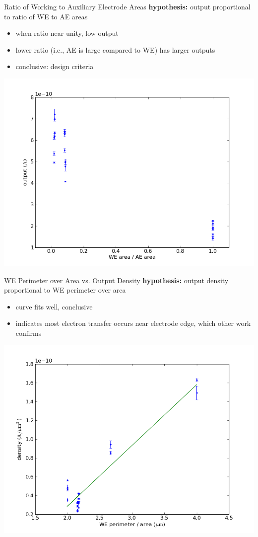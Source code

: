 \documentclass[10pt]{beamer}
\begin{document}
\begin{frame}{Ratio of Working to Auxiliary Electrode Areas}
	\textbf{hypothesis:} output proportional to ratio of WE to AE areas
	\begin{itemize}
		\item when ratio near unity, low output
		\item lower ratio (i.e., AE is large compared to WE) has larger outputs
		\item conclusive: design criteria
	\end{itemize}
	\includegraphics[width=0.8\linewidth]{figures/area_ratio_v_output.png}
\end{frame}

\begin{frame}{WE Perimeter over Area vs. Output Density}
	\textbf{hypothesis:} output density proportional to WE perimeter over area
	\begin{itemize}
		\item curve fits well, conclusive
		\item indicates most electron transfer occurs near electrode edge, which other work confirms
	\end{itemize}
	\includegraphics[width=0.8\linewidth]{figures/perim_area_v_density.png}
\end{frame}
\end{document}
